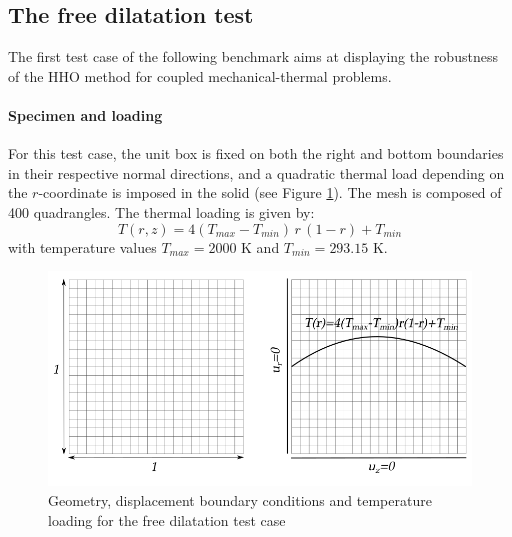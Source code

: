 \subsection{The free dilatation test}
\label{sec_satoh_test}

The first test case of the following benchmark aims at displaying the
robustness of the HHO method for coupled mechanical-thermal problems.

\paragraph{Specimen and loading}

For this test case, the unit box is fixed on both the right and
bottom boundaries in their respective normal directions, and a quadratic
thermal load depending on the $r$-coordinate is imposed in the solid
(see Figure \ref{fig_satoh_setting}). The mesh is composed of 400
quadrangles. The thermal loading is given by:
%
%
%
\begin{equation}
    T(r,z) = 4 (T_{max} - T_{min}) \, r \, (1 - r) + T_{min}
\end{equation}
%
%
%
with temperature values $T_{max} = 2000$ K and $T_{min} = 293.15$ K.

\begin{figure}[H]
    \centering
    \includegraphics[width=10.cm]{../chapter_002_hho_mechanics/figures/satoh_setting.png}
    \caption{Geometry, displacement boundary conditions and temperature loading for the free dilatation test case}
    \label{fig_satoh_setting}
\end{figure}


